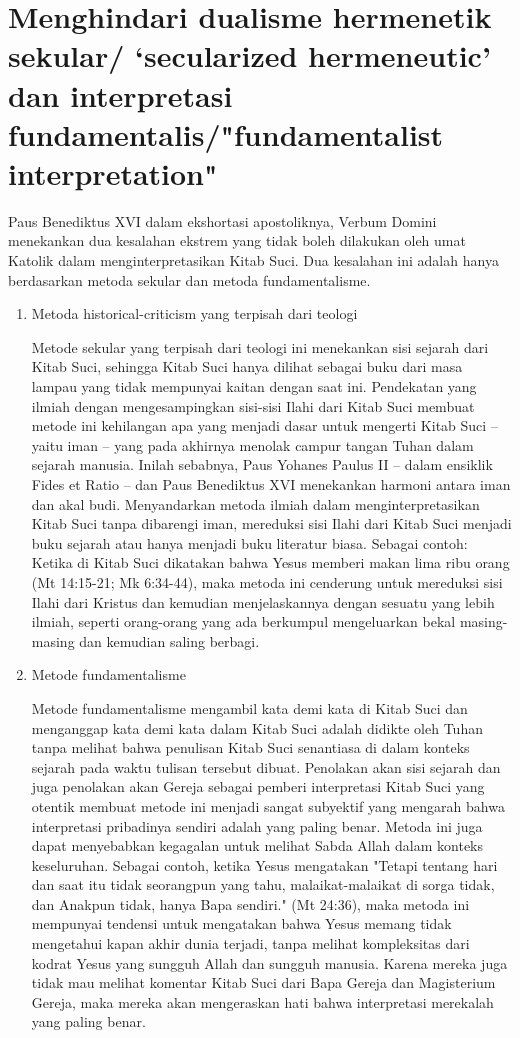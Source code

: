 \section*{Menghindari dualisme hermenetik sekular/ ‘secularized hermeneutic’ dan interpretasi fundamentalis/"fundamentalist interpretation"}
Paus Benediktus XVI dalam ekshortasi apostoliknya, Verbum Domini menekankan dua kesalahan ekstrem yang tidak boleh dilakukan oleh umat Katolik dalam menginterpretasikan Kitab Suci. Dua kesalahan ini adalah hanya berdasarkan metoda sekular dan metoda fundamentalisme.
\begin{enumerate}
\item Metoda historical-criticism yang terpisah dari teologi

Metode sekular yang terpisah dari teologi ini menekankan sisi sejarah dari Kitab Suci, sehingga Kitab Suci hanya dilihat sebagai buku dari masa lampau yang tidak mempunyai kaitan dengan saat ini. Pendekatan yang ilmiah dengan mengesampingkan sisi-sisi Ilahi dari Kitab Suci membuat metode ini kehilangan apa yang menjadi dasar untuk mengerti Kitab Suci – yaitu iman – yang pada akhirnya menolak campur tangan Tuhan dalam sejarah manusia. Inilah sebabnya, Paus Yohanes Paulus II – dalam ensiklik Fides et Ratio – dan Paus Benediktus XVI menekankan harmoni antara iman dan akal budi. Menyandarkan metoda ilmiah dalam menginterpretasikan Kitab Suci tanpa dibarengi iman, mereduksi sisi Ilahi dari Kitab Suci menjadi buku sejarah atau hanya menjadi buku literatur biasa. Sebagai contoh: Ketika di Kitab Suci dikatakan bahwa Yesus memberi makan lima ribu orang (Mt 14:15-21; Mk 6:34-44), maka metoda ini cenderung untuk mereduksi sisi Ilahi dari Kristus dan kemudian menjelaskannya dengan sesuatu yang lebih ilmiah, seperti orang-orang yang ada berkumpul mengeluarkan bekal masing-masing dan kemudian saling berbagi.

\item Metode fundamentalisme

Metode fundamentalisme mengambil kata demi kata di Kitab Suci dan menganggap kata demi kata dalam Kitab Suci adalah didikte oleh Tuhan tanpa melihat bahwa penulisan Kitab Suci senantiasa di dalam konteks sejarah pada waktu tulisan tersebut dibuat. Penolakan akan sisi sejarah dan juga penolakan akan Gereja sebagai pemberi interpretasi Kitab Suci yang otentik membuat metode ini menjadi sangat subyektif yang mengarah bahwa interpretasi pribadinya sendiri adalah yang paling benar. Metoda ini juga dapat menyebabkan kegagalan untuk melihat Sabda Allah dalam konteks keseluruhan. Sebagai contoh, ketika Yesus mengatakan "Tetapi tentang hari dan saat itu tidak seorangpun yang tahu, malaikat-malaikat di sorga tidak, dan Anakpun tidak, hanya Bapa sendiri." (Mt 24:36), maka metoda ini mempunyai tendensi untuk mengatakan bahwa Yesus memang tidak mengetahui kapan akhir dunia terjadi, tanpa melihat kompleksitas dari kodrat Yesus yang sungguh Allah dan sungguh manusia. Karena mereka juga tidak mau melihat komentar Kitab Suci dari Bapa Gereja dan Magisterium Gereja, maka mereka akan mengeraskan hati bahwa interpretasi merekalah yang paling benar.
\end{enumerate}


